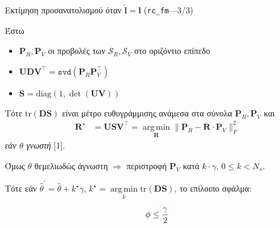\begin{frame}{Εκτίμηση προσανατολισμού όταν $\hat{\bm{l}} = \bm{l}$ (\texttt{rc\_fm}---3/3)}



  Έστω
  \begin{itemize}
    \item $\bm{P}_R, \bm{P}_V$ οι προβολές των $\mathcal{S}_R, \mathcal{S}_V$
          στο οριζόντιο επίπεδο
    \item $\bm{U} \bm{D} \bm{V}^\top = \texttt{svd}(\bm{P}_R \bm{P}_V^\top)$
    \item $\bm{S} = \text{diag}(1,\det{(\bm{U}\bm{V})})$
  \end{itemize}
  Τότε $\text{tr}(\bm{DS})$ είναι μέτρο ευθυγράμμισης ανάμεσα στα σύνολα $\bm{P}_R, \bm{P}_V$
  και
  \begin{align}
    \bm{R}^\star &= \bm{U} \bm{S} \bm{V}^\top =
                  \operatorname*{arg\,min}\limits_{\bm{R}} \|\bm{P}_R - \bm{R} \cdot \bm{P}_V\|_F^2 \nonumber
  \end{align}
   \textit{εάν $\theta$ γνωστή} [1].

   Όμως $\theta$ θεμελιωδώς άγνωστη $\Rightarrow$ περιστροφή $\bm{P}_V$ κατά
   $k\cdot\gamma$, $0 \leq k < N_s$.

   Τότε εάν $\hat{\theta}^\prime = \hat{\theta} + k^\star \gamma$,
   $k^\star = \operatorname*{arg\,min}\limits_k \text{tr}(\bm{DS})$, το επίλοιπο σφάλμα:

  \begin{align}
    \phi \leq \dfrac{\textcolor{r}{\gamma}}{2} \nonumber
  \end{align}

\end{frame}
